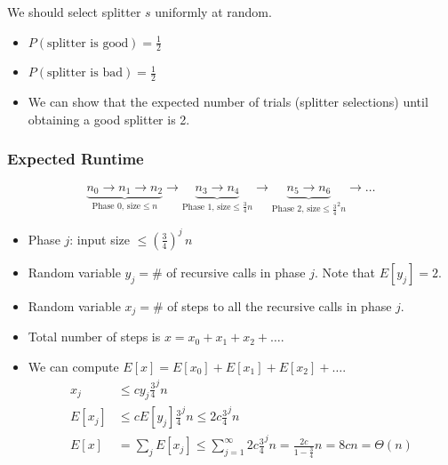 \documentclass[a4paper,12pt]{article}
\begin{document}
We should select splitter $s$ uniformly at random.
\begin{itemize}
    \item $P(\text{splitter is good})=\frac{1}{2}$
    \item $P(\text{splitter is bad})=\frac{1}{2}$
    \item We can show that the expected number of trials (splitter selections) until obtaining a good splitter is 2.
\end{itemize}
\subsubsection{Expected Runtime}
\begin{equation}
    \underbrace{n_0\to n_1\to n_2}_{\text{Phase 0, size}\leq n}\to \underbrace{n_3\to n_4}_{\text{Phase 1, size}\leq \frac{3}{4}n}\to \underbrace{n_5\to n_6}_{\text{Phase 2, size}\leq \frac{3}{4}^2 n}\to\dots
\end{equation}
\begin{itemize}
    \item Phase $j$: input size $\leq(\frac{3}{4})^j\,n$
    \item Random variable $y_j = $\# of recursive calls in phase $j$. Note that $E[y_j]=2$.
    \item Random variable $x_j = $\# of steps to all the recursive calls in phase $j$.
    \item Total number of steps is $x=x_0+x_1+x_2+\dots$.
    \item We can compute $E[x]=E[x_0]+E[x_1]+E[x_2]+\dots$.
    \begin{align}
        x_j&\leq c y_j \frac{3}{4}^j n\\
        E[x_j]&\leq c E[y_j] \frac{3}{4}^j n\leq 2c\frac{3}{4}^j n\\
        E[x]&=\sum_j E[x_j]\leq \sum_{j=1}^\infty 2c\frac{3}{4}^j n=\frac{2c}{1-\frac{3}{4}}n=8cn=\Theta(n)
    \end{align}
\end{itemize}
\end{document}
